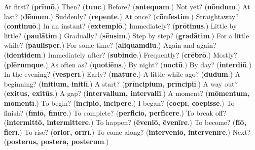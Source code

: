 \begin{tcolorbox}[breakable,colback=teal!4,colframe=teal!35!black,title={Before you move on}]
At first? (\textbf{prīmō}.) Then? (\textbf{tunc}.) Before? (\textbf{antequam}.) Not yet? (\textbf{nōndum}.) At last? (\textbf{dēmum}.) Suddenly? (\textbf{repente}.) At once? (\textbf{cōnfestim}.) Straightaway? (\textbf{continuō}.) In an instant? (\textbf{extemplō}.) Immediately? (\textbf{prōtinus}.) Little by little? (\textbf{paulātim}.) Gradually? (\textbf{sēnsim}.) Step by step? (\textbf{gradātim}.) For a little while? (\textbf{paulisper}.) For some time? (\textbf{aliquamdiū}.) Again and again? (\textbf{identidem}.) Immediately after? (\textbf{subinde}.) Frequently? (\textbf{crēbrō}.) Mostly? (\textbf{plērumque}.) As often as? (\textbf{quotiēns}.) By night? (\textbf{noctū}.) By day? (\textbf{interdiū}.) In the evening? (\textbf{vesperī}.) Early? (\textbf{mātūrē}.) A little while ago? (\textbf{dūdum}.) A beginning? (\textbf{initium, initiī}.) A start? (\textbf{prīncipium, prīncipiī}.) A way out? (\textbf{exitus, exitūs}.) A gap? (\textbf{intervallum, intervallī}.) A moment? (\textbf{mōmentum, mōmentī}.) To begin? (\textbf{incipiō, incipere}.) I began? (\textbf{coepī, coepisse}.) To finish? (\textbf{fīniō, fīnīre}.) To complete? (\textbf{perficiō, perficere}.) To break off? (\textbf{intermittō, intermittere}.) To happen? (\textbf{ēveniō, ēvenīre}.) To become? (\textbf{fīō, fierī}.) To rise? (\textbf{orior, orīrī}.) To come along? (\textbf{interveniō, intervenīre}.) Next? (\textbf{posterus, postera, posterum}.)
\end{tcolorbox}
